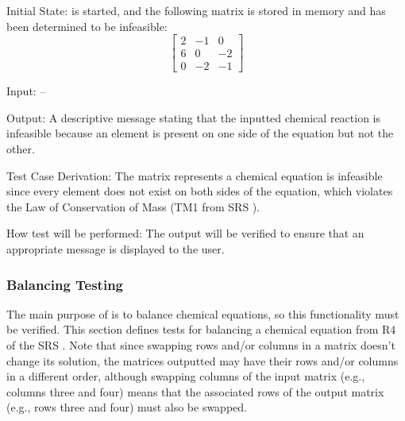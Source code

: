 \documentclass[12pt, titlepage]{article}
\begin{document}
\begin{enumerate}
    Initial State: \progname{} is started, and the following matrix is
    stored in memory and has been determined to be infeasible:
    $$\begin{bmatrix}
        2 & -1 & 0  \\
        6 & 0  & -2 \\
        0 & -2 & -1
      \end{bmatrix}$$

    Input: --

    Output: A descriptive message stating that the inputted chemical reaction
    is infeasible because an element is present on one side of the equation but
    not the other. 

    Test Case Derivation: The matrix represents a chemical equation is
    infeasible since
    every element does not exist on both sides of the equation, which violates
    the Law of Conservation of Mass (TM1 from SRS ).

    How test will be performed: The output will be verified to ensure that an
    appropriate message is displayed to the user.
\end{enumerate}

\subsubsection{Balancing Testing}

The main purpose of \progname{} is to balance chemical equations, so this
functionality must be verified. This section defines tests for balancing a
chemical equation from
R4 of the SRS . 
Note that since swapping rows and/or columns in a matrix doesn't change its
solution, the matrices outputted may have their rows and/or columns in a
different order, although swapping columns of the input matrix (e.g., columns
three and four) means that the associated rows of the output matrix (e.g., rows
three and four) must also be swapped.
\end{document}
